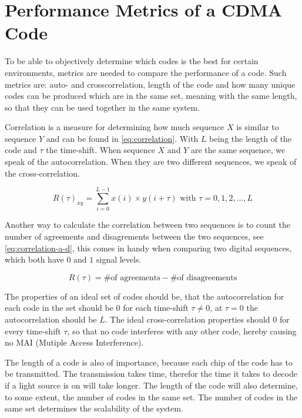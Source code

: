 
\section{Performance Metrics of a CDMA Code}

To be able to objectively determine which codes is the best for certain environments, metrics are needed to compare the performance of a code.
Such metrics are: auto- and crosscorrelation, length of the code and how many unique codes can be produced which are in the same set, meaning with the same length, so that they can be used together in the same system.



Correlation is a measure for determining how much sequence $X$ is similar to sequence $Y$ and can be found in \autoref{eq:correlation}.
With $L$ being the length of the code and $\tau$ the time-shift.
When sequence $X$ and $Y$ are the same sequence, we speak of the autocorrelation.
When they are two different sequences, we speak of the cross-correlation. 

\begin{equation}
	R(\tau)_{xy} = \displaystyle\sum_{i = 0} ^ {L - 1} x(i) \times y(i + \tau) {\text{  with $\tau = 0, 1, 2, \dotsc, L$}}
	\label{eq:correlation}
\end{equation}


Another way to calculate the correlation between two sequences is to count the number of agreements and disagrements between the two sequences, see \autoref{eq:correlation-a-d}, this comes in handy when comparing two digital sequences, which both have $0$ and $1$ signal levels.

\begin{equation}
	R(\tau) = \text{\# of agreements} - \text{\# of disagreements} 
	\label{eq:correlation-a-d}
\end{equation}




The properties of an ideal set of codes should be, that the autocorrelation for each code in the set should be $0$ for each time-shift $\tau \neq 0$, at $\tau = 0$ the autocorrelation should be $L$.
The ideal cross-correlation properties should $0$ for every time-shift $\tau$, so that no code interferes with any other code, hereby causing no MAI (Mutiple Access Interference).



The length of a code is also of importance, because each chip of the code has to be transmitted.
The transmission takes time, therefor the time it takes to decode if a light source is on will take longer.
The length of the code will also determine, to some extent, the number of codes in the same set.
The number of codes in the same set determines the scalability of the system.




